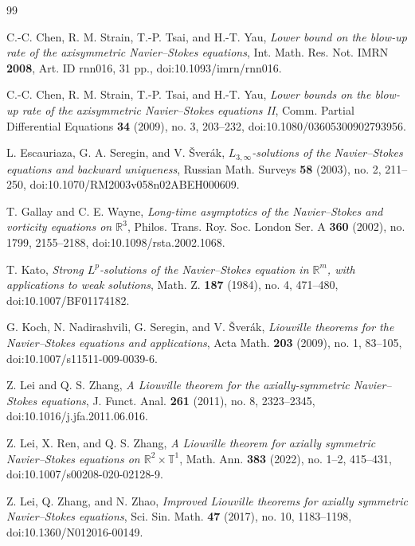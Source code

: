 \documentclass[11pt]{amsart}
\theoremstyle{plain}
\theoremstyle{definition}
\theoremstyle{remark}
\numberwithin{equation}{section}
\begin{document}
\begin{thebibliography}{99}

C.-C. Chen, R. M. Strain, T.-P. Tsai, and H.-T. Yau,
\emph{Lower bound on the blow-up rate of the axisymmetric Navier--Stokes
equations},
Int. Math. Res. Not. IMRN \textbf{2008}, Art. ID rnn016, 31 pp.,
doi:10.1093/imrn/rnn016.

C.-C. Chen, R. M. Strain, T.-P. Tsai, and H.-T. Yau,
\emph{Lower bounds on the blow-up rate of the axisymmetric Navier--Stokes
equations II},
Comm. Partial Differential Equations \textbf{34} (2009), no. 3, 203--232,
doi:10.1080/03605300902793956.

L. Escauriaza, G. A. Seregin, and V. \v{S}ver\'ak,
\emph{\(L_{3,\infty}\)-solutions of the Navier--Stokes equations and backward
uniqueness},
Russian Math. Surveys \textbf{58} (2003), no. 2, 211--250,
doi:10.1070/RM2003v058n02ABEH000609.

T. Gallay and C. E. Wayne,
\emph{Long-time asymptotics of the Navier--Stokes and vorticity equations on
\(\mathbb R^3\)},
Philos. Trans. Roy. Soc. London Ser. A \textbf{360} (2002), no. 1799,
2155--2188, doi:10.1098/rsta.2002.1068.

T. Kato,
\emph{Strong \(L^p\)-solutions of the Navier--Stokes equation in
\(\mathbb R^m\), with applications to weak solutions},
Math. Z. \textbf{187} (1984), no. 4, 471--480,
doi:10.1007/BF01174182.

G. Koch, N. Nadirashvili, G. Seregin, and V. \v{S}ver\'ak,
\emph{Liouville theorems for the Navier--Stokes equations and applications},
Acta Math. \textbf{203} (2009), no. 1, 83--105,
doi:10.1007/s11511-009-0039-6.

Z. Lei and Q. S. Zhang,
\emph{A Liouville theorem for the axially-symmetric Navier--Stokes equations},
J. Funct. Anal. \textbf{261} (2011), no. 8, 2323--2345,
doi:10.1016/j.jfa.2011.06.016.

Z. Lei, X. Ren, and Q. S. Zhang,
\emph{A Liouville theorem for axially symmetric Navier--Stokes equations on
\(\mathbb R^2\times\mathbb T^1\)},
Math. Ann. \textbf{383} (2022), no. 1--2, 415--431,
doi:10.1007/s00208-020-02128-9.

Z. Lei, Q. Zhang, and N. Zhao,
\emph{Improved Liouville theorems for axially symmetric Navier--Stokes
equations},
Sci. Sin. Math. \textbf{47} (2017), no. 10, 1183--1198,
doi:10.1360/N012016-00149.


\end{thebibliography}
\end{document}
